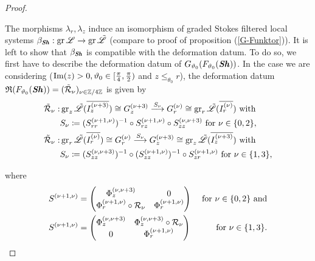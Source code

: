 \begin{proof}
\begin{center}
\end{center}
  The morphisms $\lambda_r,\lambda_z$ induce an isomorphism of graded Stokes filtered local systems $\beta_{\bm{\mathit{Sh}}}: \operatorname{gr}\mathscr{L} \to \operatorname{gr}\tilde{\mathscr{L}}$ (compare to proof of proposition (\ref{G-Funktor})). It is left to show that $\beta_{\bm{\mathit{Sh}}}$ is compatible with the deformation datum. To do so, we first have to describe the deformation datum of $G_{\vartheta_0}(F_{\vartheta_0}(\bm{\mathit{Sh}}))$. In the case we are considering ($\operatorname{Im}(z) >0, \vartheta_0 \in [\frac{\pi}{4}, \frac{\pi}{2})$ and $z \leq_{\theta_0} r$), the deformation datum $\mathfrak{R}(F_{\vartheta_0}(\bm{\mathit{Sh}}))=(\tilde{\mathcal{R}}_\nu)_{\nu \in \mathbb{Z}/4\mathbb{Z}}$ is given by
\begin{align*}
        \tilde{\mathcal{R}}_\nu: &\operatorname{gr}_z\tilde{\mathscr{L}}(\overline{I_z^{(\nu+3)}}) \cong G_z^{(\nu + 3)} \overset{S_\nu}{\longrightarrow} G_r^{(\nu)} \cong \operatorname{gr}_r\tilde{\mathscr{L}}(\overline{I_r^{(\nu)}}) \text{ with } \\
        &S_\nu \coloneqq (S_{rr}^{(\nu+1,\nu)})^{-1} \circ S_{rz}^{(\nu+1,\nu)}\circ S_{zz}^{(\nu,\nu+3)} \text{ for } \nu \in \{0,2\}, \\
        \tilde{\mathcal{R}}_\nu: &\operatorname{gr}_r\tilde{\mathscr{L}}(\overline{I_r^{(\nu)}}) \cong G_r^{(\nu)} \overset{S_\nu}{\longrightarrow} G_z^{(\nu+3)} \cong \operatorname{gr}_z\tilde{\mathscr{L}}(\overline{I_z^{(\nu+3)}}) \text{ with } \\
        & S_\nu \coloneqq (S_{zz}^{(\nu,\nu+3)})^{-1}\circ (S_{zz}^{(\nu+1,\nu)})^{-1} \circ S_{zr}^{(\nu+1,\nu)} \text{ for } \nu \in \{1,3\},
\end{align*}

where 
\begin{align*}
    S^{(\nu+1,\nu)} & = \begin{pmatrix}
        \Phi_z^{(\nu,\nu+3)} & 0 \\
        \Phi_r^{(\nu+1,\nu)} \circ \mathcal{R}_\nu & \Phi_r^{(\nu+1,\nu)} 
    \end{pmatrix} &\text{ for } \nu \in \{0,2\} \text{ and} \\
    S^{(\nu+1,\nu)} & = \begin{pmatrix}
        \Phi_z^{(\nu,\nu+3)} & \Phi_z^{(\nu,\nu+3)} \circ \mathcal{R}_\nu \\
        0 & \Phi_r^{(\nu+1,\nu)} 
    \end{pmatrix} &\text{ for } \nu \in \{1,3\}.
\end{align*}


\end{proof}
